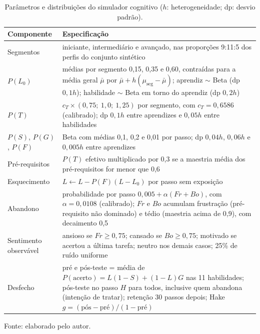 \begin{table}[htbp]
\centering
\caption[Parâmetros do simulador cognitivo]{Parâmetros e distribuições do simulador cognitivo ($h$: heterogeneidade; dp: desvio padrão).}
\label{tab:apendice_simulador}
\footnotesize\setlength{\tabcolsep}{4pt}
\begin{tabular}{lp{}}
\hline
\textbf{Componente} & \textbf{Especificação} \\
\hline
Segmentos & iniciante, intermediário e avançado, nas proporções 9:11:5 dos perfis do conjunto sintético \\
$P(L_0)$ & médias por segmento 0,15, 0,35 e 0,60, contraídas para a média geral $\bar{\mu}$ por $\bar{\mu} + h(\mu_{\text{seg}} - \bar{\mu})$; aprendiz $\sim$ Beta (dp $0{,}1h$); habilidade $\sim$ Beta em torno do aprendiz (dp $0{,}2h$) \\
$P(T)$ & $c_T \times (0{,}75;\ 1{,}0;\ 1{,}25)$ por segmento, com $c_T = 0{,}6586$ (calibrado); dp $0{,}1h$ entre aprendizes e $0{,}05h$ entre habilidades \\
$P(S)$, $P(G)$, $P(F)$ & Beta com médias 0,1, 0,2 e 0,01 por passo; dp $0{,}04h$, $0{,}06h$ e $0{,}005h$ entre aprendizes \\
Pré-requisitos & $P(T)$ efetivo multiplicado por 0,3 se a maestria média dos pré-requisitos for menor que 0,6 \\
Esquecimento & $L \leftarrow L - P(F)(L - L_0)$ por passo sem exposição \\
Abandono & probabilidade por passo $0{,}005 + \alpha(\mathit{Fr} + \mathit{Bo})$, com $\alpha = 0{,}0108$ (calibrado); $\mathit{Fr}$ e $\mathit{Bo}$ acumulam frustração (pré-requisito não dominado) e tédio (maestria acima de 0,9), com decaimento 0,5 \\
Sentimento observável & ansioso se $\mathit{Fr} \geq 0{,}75$; cansado se $\mathit{Bo} \geq 0{,}75$; motivado se acertou a última tarefa; neutro nos demais casos; 25\% de ruído uniforme \\
Desfecho & pré e pós-teste = média de $P(\text{acerto}) = L(1-S) + (1-L)G$ nas 11 habilidades; pós-teste no passo $H$ para todos, inclusive quem abandona (intenção de tratar); retenção 30 passos depois; Hake $g = (\text{pós} - \text{pré})/(1 - \text{pré})$ \\
\hline
\end{tabular}

{\footnotesize Fonte: elaborado pelo autor.}
\end{table}

